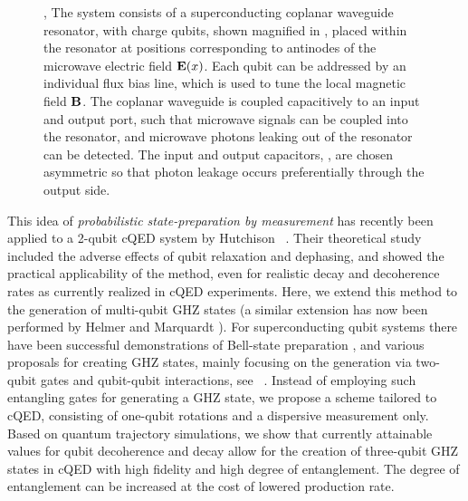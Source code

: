 \begin{figure}
   \centering
   \caption[Sketch of the circuit QED architecture]
   { , The system consists of a superconducting coplanar waveguide resonator, with charge qubits, shown magnified in , placed within the resonator at positions corresponding to antinodes of the microwave electric field $\mathbf{E}(x)$. Each qubit can be addressed by an individual flux bias line, which is used to tune the local magnetic field $\mathbf{B}$. The coplanar waveguide is coupled capacitively to an input and output port, such that microwave signals can be coupled into the resonator, and microwave photons leaking out of the resonator can be detected. The input and output capacitors, , are chosen asymmetric so that photon leakage occurs preferentially through the output side.\label{fig:figure0}}
\end{figure}

This idea of \emph{probabilistic state-preparation by measurement} has recently been applied to a 2-qubit cQED system by Hutchison \etal\ \cite{hutchison_quantum_2008}. Their theoretical study included the adverse effects of qubit relaxation and dephasing, and showed the practical applicability of the method, even for realistic decay and decoherence rates as currently realized in cQED experiments. Here, we extend this method to the generation of multi-qubit GHZ states \cite{greenberger_going_1989} (a similar extension has now been performed by Helmer and Marquardt \cite{Helmer2009}). For superconducting qubit systems there have been successful demonstrations of Bell-state preparation \cite{steffen_measurement_2006, plantenberg_demonstration_2007, filipp_two-qubit_2008, dicarlo_demonstration_2009}, and various proposals for creating GHZ states, mainly focusing on the generation via two-qubit gates and qubit-qubit interactions, see \eg\ \cite{galiautdinov_maximally_2008, wei_generation_2006, kim:100508}. Instead of employing such entangling gates for generating a GHZ state, we propose a scheme tailored to cQED, consisting of one-qubit rotations and a dispersive measurement only. Based on quantum trajectory simulations, we show that currently attainable values for qubit decoherence and decay allow for the creation of three-qubit GHZ states in cQED with high fidelity and high degree of entanglement. The degree of entanglement can be increased at the cost of lowered production rate.

